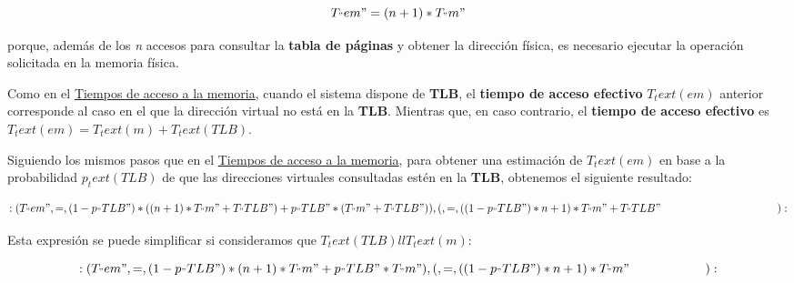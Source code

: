 \[T_"em" = (n+1)*T_"m"\]

porque, además de los \emph{n} accesos para consultar la \textbf{tabla
de páginas} y obtener la dirección física, es necesario ejecutar la
operación solicitada en la memoria física.

Como en el \hyperref[_tiempos_de_acceso_a_la_memoria]{Tiempos de acceso
a la memoria}, cuando el sistema dispone de \textbf{TLB}, el
\textbf{tiempo de acceso efectivo} \(T_text(em)\) anterior corresponde
al caso en el que la dirección virtual no está en la \textbf{TLB}.
Mientras que, en caso contrario, el \textbf{tiempo de acceso efectivo}
es \(T_text(em)=T_text(m) + T_text(TLB)\).

Siguiendo los mismos pasos que en el
\hyperref[_tiempos_de_acceso_a_la_memoria]{Tiempos de acceso a la
memoria}, para obtener una estimación de \(T_text(em)\) en base a la
probabilidad \(p_text(TLB)\) de que las direcciones virtuales
consultadas estén en la \textbf{TLB}, obtenemos el siguiente resultado:

\[{:(T_"em", =, (1-p_"TLB")*((n+1)*T_"m" + T_"TLB") + p_"TLB"*(T_"m" + T_"TLB")),
    (    , =, ((1-p_"TLB")*n+1)*T_"m" + T_"TLB"\qquad\qquad\qquad\qquad\qquad\ \ ):}\]

Esta expresión se puede simplificar si consideramos que
\(T_text(TLB) ll T_text(m)\):

\[{:(T_"em", =, (1-p_"TLB")*(n+1)*T_"m" + p_"TLB"*T_"m"),
    (    , =, ((1-p_"TLB")*n+1)*T_"m"\qquad\qquad\qquad):}\]
